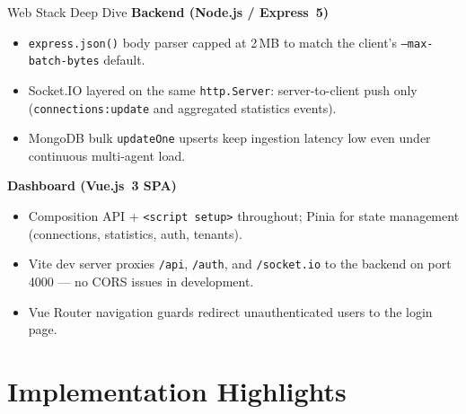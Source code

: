 \documentclass[aspectratio=169]{beamer}
\begin{document}
\begin{frame}{Web Stack Deep Dive}
    \textbf{Backend (Node.js / Express~5)}
    \begin{itemize}
        \item \texttt{express.json()} body parser capped at 2\,MB to match the client's
              \texttt{--max-batch-bytes} default.
        \item Socket.IO layered on the same \texttt{http.Server}: server-to-client push
              only (\texttt{connections:update} and aggregated statistics events).
        \item MongoDB bulk \texttt{updateOne} upserts keep ingestion latency low even under
              continuous multi-agent load.
    \end{itemize}
    \vspace{0.3cm}
    \textbf{Dashboard (Vue.js~3 SPA)}
    \begin{itemize}
        \item Composition API + \texttt{<script setup>} throughout; Pinia for state
              management (connections, statistics, auth, tenants).
        \item Vite dev server proxies \texttt{/api}, \texttt{/auth}, and
              \texttt{/socket.io} to the backend on port 4000 --- no CORS issues in
              development.
        \item Vue Router navigation guards redirect unauthenticated users to the login page.
    \end{itemize}
\end{frame}

\section{Implementation Highlights}
\end{document}
